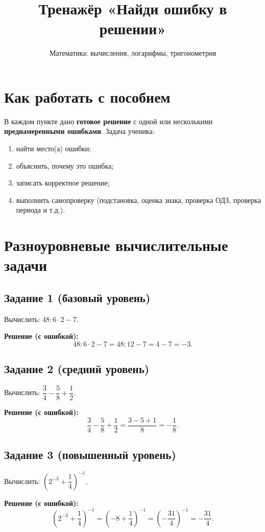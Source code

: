 \documentclass[12pt,a4paper]{article}
\title{Тренажёр «Найди ошибку в решении»}
\author{Математика: вычисления, логарифмы, тригонометрия}
\date{}
\begin{document}
\maketitle

\section*{Как работать с пособием}
В каждом пункте дано \textbf{готовое решение} с одной или несколькими \textbf{преднамеренными ошибками}.
Задача ученика:
\begin{enumerate}
    \item найти место(а) ошибки;
    \item объяснить, почему это ошибка;
    \item записать корректное решение;
    \item выполнить самопроверку (подстановка, оценка знака, проверка ОДЗ, проверка периода и т.д.).
\end{enumerate}

\section{Разноуровневые вычислительные задачи}

\subsection*{Задание 1 (базовый уровень)}
Вычислить: $48:6\cdot 2-7$.

\textbf{Решение (с ошибкой):}
\[
48:6\cdot 2-7 = 48:12-7 = 4-7=-3.
\]

\subsection*{Задание 2 (средний уровень)}
Вычислить: $\dfrac{3}{4}-\dfrac{5}{8}+\dfrac{1}{2}$.

\textbf{Решение (с ошибкой):}
\[
\frac{3}{4}-\frac{5}{8}+\frac{1}{2}
= \frac{3-5+1}{8}
= -\frac{1}{8}.
\]

\subsection*{Задание 3 (повышенный уровень)}
Вычислить: $\left(2^{-3}+\dfrac{1}{4}\right)^{-1}$.

\textbf{Решение (с ошибкой):}
\[
\left(2^{-3}+\frac{1}{4}\right)^{-1}
= \left(-8+\frac{1}{4}\right)^{-1}
= \left(-\frac{31}{4}\right)^{-1}
= -\frac{31}{4}.
\]
\end{document}
